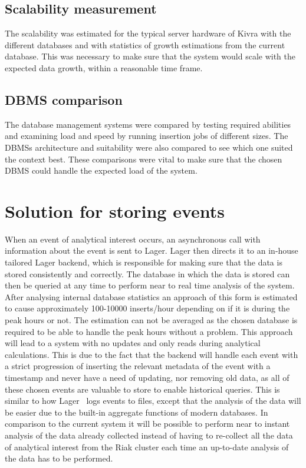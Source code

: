 \documentclass[a4paper,12pt]{article}
\begin{document}
\subsection{Scalability measurement}
The scalability was estimated for the typical server hardware of Kivra with the different databases and with statistics of growth estimations from the current database. 
This was necessary to make sure that the system would scale with the expected data growth, within a reasonable time frame. 

\subsection{DBMS comparison}
The database management systems were compared by testing required abilities and examining load and speed by running insertion jobs of different sizes. 
The DBMSs architecture and suitability were also compared to see which one suited the context best. 
These comparisons were vital to make sure that the chosen DBMS could handle the expected load of the system. 

\newpage
\section{Solution for storing events}
When an event of analytical interest occurs, an asynchronous call with information about the event is sent to Lager. Lager then directs it to an in-house tailored Lager backend, which is responsible for 
making sure that the data is stored consistently and correctly. The database in which the data is stored can then be queried at any time to perform near to real time analysis of the system. 
After analysing internal database statistics an approach of this form is estimated to cause approximately 100-10000 inserts/hour depending on if it is during the peak hours or not. The estimation can not be averaged as 
the chosen database is required to be able to handle the peak hours without a problem. This approach will lead to a system with no updates and only reads during analytical calculations. This is due to the fact that 
the backend will handle each event with a strict progression of inserting the relevant metadata of the event with a timestamp and never have a need of updating, nor removing old data, as all of these 
chosen events are valuable to store to enable historical queries. This is similar to how Lager~\cite{LAGER} logs events to files, except that the analysis of the data will be easier due to the 
built-in aggregate functions of modern databases. In comparison to the current system it will be possible to perform near to instant analysis of the data already collected instead of having to re-collect all 
the data of analytical interest from the Riak cluster each time an up-to-date analysis of the data has to be performed.
\end{document}
